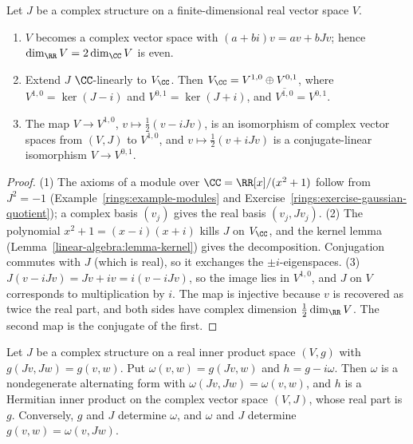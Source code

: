 \begin{proposition}\label{linear-algebra:proposition-complex-structure}
Let $J$ be a complex structure on a finite-dimensional real vector space $V$.
\begin{enumerate}
\item $V$ becomes a complex vector space with $(a + bi)v = av + bJv$; hence $\dim_\RR V = 2\dim_\CC V$ is even.
\item Extend $J$ $\CC$-linearly to $V_\CC$. Then $V_\CC = V^{1,0} \oplus V^{0,1}$, where
$V^{1,0} = \ker(J - i)$ and $V^{0,1} = \ker(J + i)$, and $\overline{V^{1,0}} = V^{0,1}$.
\item The map $V \to V^{1,0}$, $v \mapsto \frac12(v - iJv)$, is an isomorphism of complex vector spaces from
$(V, J)$ to $V^{1,0}$, and $v \mapsto \frac12(v + iJv)$ is a conjugate-linear isomorphism $V \to V^{0,1}$.
\end{enumerate}
\end{proposition}

\begin{proof}
(1) The axioms of a module over $\CC = \RR[x]/(x^2 + 1)$ follow from $J^2 = -1$
(Example~\ref{rings:example-modules} and Exercise~\ref{rings:exercise-gaussian-quotient}); a complex basis
$(v_j)$ gives the real basis $(v_j, Jv_j)$.
(2) The polynomial $x^2 + 1 = (x - i)(x + i)$ kills $J$ on $V_\CC$, and the kernel lemma
(Lemma~\ref{linear-algebra:lemma-kernel}) gives the decomposition. Conjugation commutes with $J$ (which is
real), so it exchanges the $\pm i$-eigenspaces.
(3) $J(v - iJv) = Jv + iv = i(v - iJv)$, so the image lies in $V^{1,0}$, and $J$ on $V$ corresponds to
multiplication by $i$. The map is injective because $v$ is recovered as twice the real part, and both sides
have complex dimension $\frac12\dim_\RR V$. The second map is the conjugate of the first.
\end{proof}

\begin{proposition}\label{linear-algebra:proposition-compatible-metric}
Let $J$ be a complex structure on a real inner product space $(V, g)$ with $g(Jv, Jw) = g(v, w)$. Put
$\omega(v, w) = g(Jv, w)$ and $h = g - i\omega$. Then $\omega$ is a nondegenerate alternating form with
$\omega(Jv, Jw) = \omega(v, w)$, and $h$ is a Hermitian inner product on the complex vector space $(V, J)$, whose
real part is $g$. Conversely, $g$ and $J$ determine $\omega$, and $\omega$ and $J$ determine
$g(v, w) = \omega(v, Jw)$.
\end{proposition}

